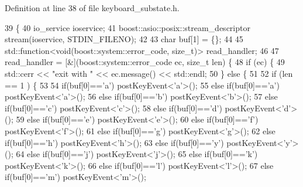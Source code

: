 Definition at line 38 of file keyboard\+\_\+substate.\+h.


\begin{DoxyCode}
39   \{
40     io\_service ioservice;        
41     boost::asio::posix::stream\_descriptor stream(ioservice, STDIN\_FILENO);
42 
43     \textcolor{keywordtype}{char} buf[1] = \{\};
44 
45     std::function<void(boost::system::error\_code, size\_t)> read\_handler;
46 
47     read\_handler = [&](boost::system::error\_code ec, \textcolor{keywordtype}{size\_t} len) \{   
48             \textcolor{keywordflow}{if} (ec) \{
49                 std::cerr << \textcolor{stringliteral}{"exit with "} << ec.message() << std::endl;
50             \} \textcolor{keywordflow}{else} \{
51                 
52                 \textcolor{keywordflow}{if} (len == 1 ) \{
53 
54                   \textcolor{keywordflow}{if}(buf[0]==\textcolor{charliteral}{'a'}) postKeyEvent<'a'>();
55                   \textcolor{keywordflow}{else} \textcolor{keywordflow}{if}(buf[0]==\textcolor{charliteral}{'a'}) postKeyEvent<'a'>();
56                   \textcolor{keywordflow}{else} \textcolor{keywordflow}{if}(buf[0]==\textcolor{charliteral}{'b'}) postKeyEvent<'b'>();
57                   \textcolor{keywordflow}{else} \textcolor{keywordflow}{if}(buf[0]==\textcolor{charliteral}{'c'}) postKeyEvent<'c'>();
58                   \textcolor{keywordflow}{else} \textcolor{keywordflow}{if}(buf[0]==\textcolor{charliteral}{'d'}) postKeyEvent<'d'>();
59                   \textcolor{keywordflow}{else} \textcolor{keywordflow}{if}(buf[0]==\textcolor{charliteral}{'e'}) postKeyEvent<'e'>();
60                   \textcolor{keywordflow}{else} \textcolor{keywordflow}{if}(buf[0]==\textcolor{charliteral}{'f'}) postKeyEvent<'f'>();
61                   \textcolor{keywordflow}{else} \textcolor{keywordflow}{if}(buf[0]==\textcolor{charliteral}{'g'}) postKeyEvent<'g'>();
62                   \textcolor{keywordflow}{else} \textcolor{keywordflow}{if}(buf[0]==\textcolor{charliteral}{'h'}) postKeyEvent<'h'>();
63                   \textcolor{keywordflow}{else} \textcolor{keywordflow}{if}(buf[0]==\textcolor{charliteral}{'y'}) postKeyEvent<'y'>();
64                   \textcolor{keywordflow}{else} \textcolor{keywordflow}{if}(buf[0]==\textcolor{charliteral}{'j'}) postKeyEvent<'j'>();
65                   \textcolor{keywordflow}{else} \textcolor{keywordflow}{if}(buf[0]==\textcolor{charliteral}{'k'}) postKeyEvent<'k'>();
66                   \textcolor{keywordflow}{else} \textcolor{keywordflow}{if}(buf[0]==\textcolor{charliteral}{'l'}) postKeyEvent<'l'>();
67                   \textcolor{keywordflow}{else} \textcolor{keywordflow}{if}(buf[0]==\textcolor{charliteral}{'m'}) postKeyEvent<'m'>();

\end{DoxyCode}
